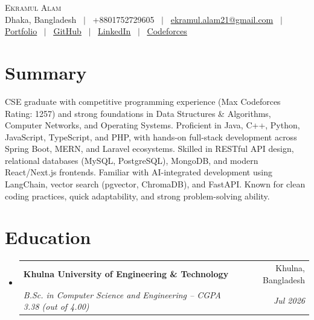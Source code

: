 \documentclass[letterpaper,10.5pt]{article}
\makeatletter
\newcommand{\resumeSubheading}[4]{
  \vspace{-2pt}\item
    \begin{tabular*}{\textwidth}[t]{l@{\extracolsep{\fill}}r}
      \textbf{#1} & #2 \\
      \textit{\small#3} & \textit{\small #4} \\
    \end{tabular*}\vspace{-7pt}
}
\newcommand{\resumeSubHeadingListStart}{\begin{itemize}[leftmargin=0.0in, label={}]}
\newcommand{\resumeSubHeadingListEnd}{\end{itemize}}
\makeatother
\begin{document}
\begin{center}
    {\Huge \scshape Ekramul Alam} \\ \vspace{3pt}
    \small Dhaka, Bangladesh ~$|$~ +8801752729605 ~$|$~
    \href{mailto:ekramul.alam21@gmail.com}{ekramul.alam21@gmail.com} ~$|$~
    \href{https://apn7.is-a.dev/}{\underline{Portfolio}} ~$|$~
    \href{https://github.com/Apn7}{\underline{GitHub}} ~$|$~
    \href{https://www.linkedin.com/in/ekramul-alam-525659255/}{\underline{LinkedIn}} ~$|$~
    \href{https://codeforces.com/profile/Apn7}{\underline{Codeforces}}
    \vspace{-6pt}
\end{center}

\section{Summary}
\small{CSE graduate with competitive programming experience (Max Codeforces Rating: 1257) and strong foundations in Data Structures \& Algorithms, Computer Networks, and Operating Systems. Proficient in Java, C++, Python, JavaScript, TypeScript, and PHP, with hands-on full-stack development across Spring Boot, MERN, and Laravel ecosystems. Skilled in RESTful API design, relational databases (MySQL, PostgreSQL), MongoDB, and modern React/Next.js frontends. Familiar with AI-integrated development using LangChain, vector search (pgvector, ChromaDB), and FastAPI. Known for clean coding practices, quick adaptability, and strong problem-solving ability.}
\vspace{-4pt}

\section{Education}
  \resumeSubHeadingListStart
    \resumeSubheading
      {Khulna University of Engineering \& Technology}{Khulna, Bangladesh}
      {B.Sc. in Computer Science and Engineering -- CGPA 3.38 (out of 4.00)}{Jul 2026}
  \resumeSubHeadingListEnd
\vspace{-6pt}

\end{document}
